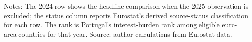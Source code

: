 \begin{table}[H]
\centering
\caption{Robustness of headline results to excluding 2025}
\label{tab:provisional-robustness}
\smallskip
\small Notes: The 2024 row shows the headline comparison when the 2025 observation is excluded; the status column reports Eurostat's derived source-status classification for each row. The rank is Portugal's interest-burden rank among eligible euro-area countries for that year. Source: author calculations from Eurostat data.
\end{table}
